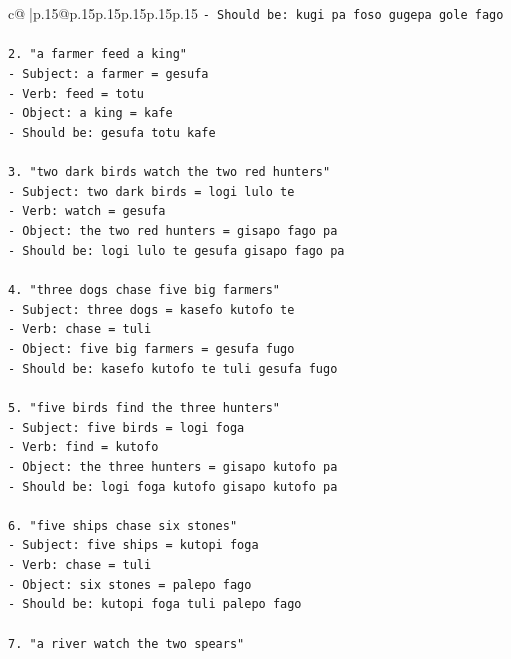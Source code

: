 \documentclass{article}
\begin{document}
{\begin{supertabular}{c@{$\;$}|p{.15\linewidth}@{}p{.15\linewidth}p{.15\linewidth}p{.15\linewidth}p{.15\linewidth}p{.15\linewidth}}
{{{\texttt{{-} Should be: kugi pa foso gugepa gole fago} \\
\\ 
\texttt{2. "a farmer feed a king"} \\
\texttt{{-} Subject: a farmer = gesufa} \\
\texttt{{-} Verb: feed = totu} \\
\texttt{{-} Object: a king = kafe} \\
\texttt{{-} Should be: gesufa totu kafe} \\
\\ 
\texttt{3. "two dark birds watch the two red hunters"} \\
\texttt{{-} Subject: two dark birds = logi lulo te} \\
\texttt{{-} Verb: watch = gesufa} \\
\texttt{{-} Object: the two red hunters = gisapo fago pa} \\
\texttt{{-} Should be: logi lulo te gesufa gisapo fago pa} \\
\\ 
\texttt{4. "three dogs chase five big farmers"} \\
\texttt{{-} Subject: three dogs = kasefo kutofo te} \\
\texttt{{-} Verb: chase = tuli} \\
\texttt{{-} Object: five big farmers = gesufa fugo} \\
\texttt{{-} Should be: kasefo kutofo te tuli gesufa fugo} \\
\\ 
\texttt{5. "five birds find the three hunters"} \\
\texttt{{-} Subject: five birds = logi foga} \\
\texttt{{-} Verb: find = kutofo} \\
\texttt{{-} Object: the three hunters = gisapo kutofo pa} \\
\texttt{{-} Should be: logi foga kutofo gisapo kutofo pa} \\
\\ 
\texttt{6. "five ships chase six stones"} \\
\texttt{{-} Subject: five ships = kutopi foga} \\
\texttt{{-} Verb: chase = tuli} \\
\texttt{{-} Object: six stones = palepo fago} \\
\texttt{{-} Should be: kutopi foga tuli palepo fago} \\
\\ 
\texttt{7. "a river watch the two spears"} \\
}}}
\end{supertabular}}
\end{document}
